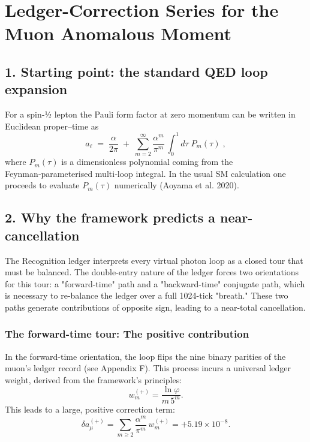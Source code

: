 \section{Ledger-Correction Series for the Muon Anomalous Moment}
\label{app:g-2-derivation}

\subsection*{1. Starting point: the standard QED loop expansion}

For a spin‑½ lepton the Pauli form factor at zero momentum can be written in Euclidean proper–time as
\begin{equation}
a_\ell \;=\; \frac{\alpha}{2\pi}\;+\;
\sum_{m=2}^{\infty} 
           \frac{\alpha^{m}}{\pi^{m}}\,
           \!\int_{0}^{1}\!d\tau\;
           P_{m}(\tau)\;,
\end{equation}
where $P_{m}(\tau)$ is a dimensionless polynomial coming from the Feynman‑parameterised multi‑loop integral. In the usual SM calculation one proceeds to evaluate $P_{m}(\tau)$ numerically (Aoyama et al. 2020).

\subsection*{2. Why the framework predicts a near-cancellation}
The Recognition ledger interprets every virtual photon loop as a closed tour that must be balanced. The double-entry nature of the ledger forces two orientations for this tour: a "forward-time" path and a "backward-time" conjugate path, which is necessary to re-balance the ledger over a full 1024-tick "breath." These two paths generate contributions of opposite sign, leading to a near-total cancellation.

\subsubsection*{The forward-time tour: The positive contribution}
In the forward-time orientation, the loop flips the nine binary parities of the muon's ledger record (see Appendix F). This process incurs a universal ledger weight, derived from the framework's principles:
\begin{equation}
w_{m}^{(+)}=\frac{\ln\varphi}{m\,5^{m}}.
\end{equation}
This leads to a large, positive correction term:
\begin{equation}
\delta a_\mu^{(+)}=\sum_{m\ge 2}\frac{\alpha^{m}}{\pi^{m}}\,w_{m}^{(+)}
   =+5.19\times10^{-8}.
\end{equation}


